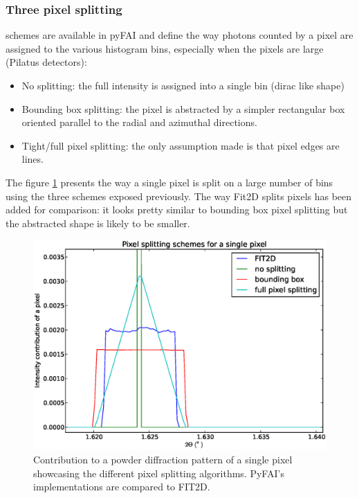 \documentclass[preprint]{iucr}
\begin{document}
\subsubsection{Three pixel splitting} schemes are available in pyFAI and define
the way photons counted by a pixel are assigned to the various histogram bins,
especially when the pixels are large (Pilatus detectors):
\begin{itemize}
\item No splitting: the full intensity is assigned into a single bin (dirac
like shape)
\item Bounding box splitting: the pixel is abstracted by a simpler rectangular box
oriented parallel to the radial and azimuthal directions.
\item
Tight/full pixel splitting: the only assumption made is that pixel
edges are lines.
\end{itemize}
The figure \ref{split} presents the way a single pixel is split on a
large number of bins using the three schemes exposed previously. The way Fit2D
splits pixels has been added for comparison: it looks pretty similar to bounding
box pixel splitting but the abstracted shape is likely to be smaller.

\begin{figure}
\label{split}
\begin{center}
\includegraphics[width=15cm]{splitpixel.eps}
\caption{Contribution to a powder diffraction pattern of a single pixel showcasing the
different pixel splitting algorithms. PyFAI's implementations are
compared to FIT2D.}
\end{center}
\end{figure}
\end{document}
